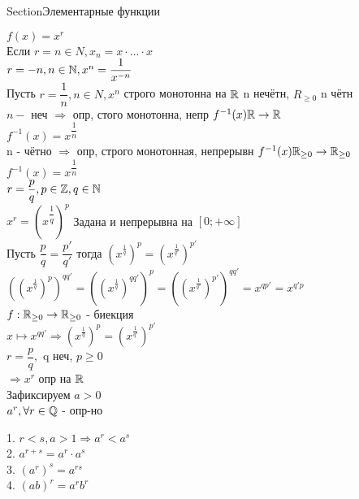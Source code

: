 Section{Элементарные функции} 

\begin{definition}
$ f(x) = x^r $\\
Если $ r = n \in N, x_n = x \cdot ... \cdot x $ \\
$ r = -n, n \in \mathbb{N}, x^n = \dfrac{ 1}{x^{-n}} $ \\
Пусть $ r = \dfrac{1}{n} , n \in N, x^n $ строго монотонна на $ \mathbb{R} $ n нечётн, $ R_{\geq 0} $ n чётн \\
$ n - $ неч $ \Rightarrow $ опр, стого монотонна, непр $ f^{-1} (x) \mathbb{R} \rightarrow \mathbb{R} $ \\
$ f^{-1} (x) = x^{\dfrac{1}{n}} $ \\
n - чётно $ \Rightarrow $ опр, строго монотонная, непрерывн $ f^{-1} (x) \mathbb{R}_{\geq 0} \rightarrow \mathbb{R}_{\geq 0} $ \\
$ f^{-1} (x) = x^{\dfrac{1}{n}} $ \\
$ r = \dfrac{p}{q}, p \in \mathbb{Z}, q \in \mathbb{N} $\\
$ x^r = (x^{\dfrac{1}{q}})^p $ Задана и непрерывна на $[0; +\infty] $\\
Пусть $ \dfrac{p}{q} = \dfrac{p'}{q'} $ тогда $ (x^{\frac{1}{q}})^p = (x^{\frac{1}{q'}})^{p'} $ \\
$ ((x^{\frac{1}{q}})^p)^{qq'} = ((x^{\frac{1}{q}})^{qq'})^p = ((x^{\frac{1}{q'}})^{p'})^{qq'} = x^{qp'} = x^{q'p}$ \\
$ f : \mathbb{R}_{\geq 0} \rightarrow \mathbb{R}_{\geq 0} $ - биекция \\
$ x \mapsto x^{qq'} \Rightarrow (x^{\frac{1}{q}})^p = (x^{\frac{1}{q'}})^{p'}$ \\
$ r = \dfrac{p}{q}, $ q неч,  $ p \geq 0 $ \\
$ \Rightarrow x^r $ опр на $ \mathbb{R} $ \\

Зафиксируем $ a > 0 $ \\
$ a^r, \forall r \in \mathbb{Q} $ - опр-но\\
\begin{properties}
	1. $ r < s, a > 1 \Rightarrow a^r < a^s $ \\
	2. $ a^{r+s} = a^r \cdot a^s $ \\
	3. $ (a^r)^s = a^{rs}$ \\
	4. $ (ab)^r = a^rb^r $
\end{properties}


\end{definition}
